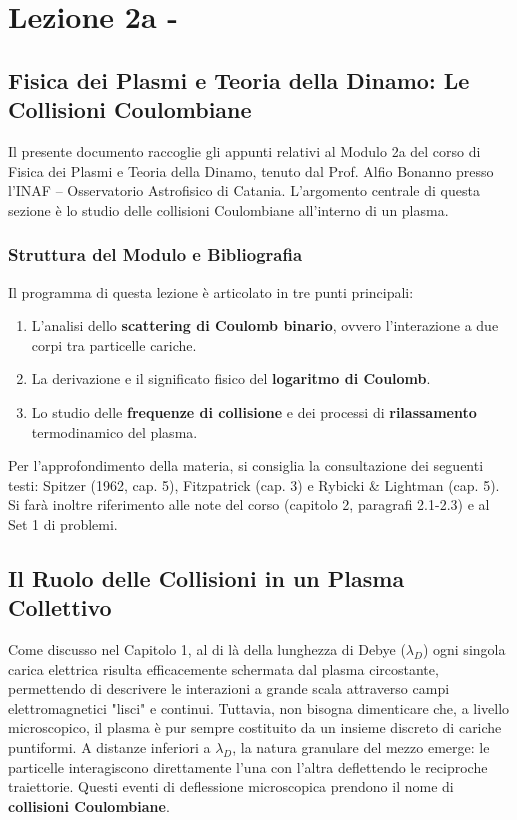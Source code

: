 \chapter{Lezione 2a -}

\section{Fisica dei Plasmi e Teoria della Dinamo: Le Collisioni Coulombiane}

Il presente documento raccoglie gli appunti relativi al Modulo 2a del corso di Fisica dei Plasmi e Teoria della Dinamo, tenuto dal Prof. Alfio Bonanno presso l'INAF – Osservatorio Astrofisico di Catania. L'argomento centrale di questa sezione è lo studio delle collisioni Coulombiane all'interno di un plasma.

\subsection{Struttura del Modulo e Bibliografia}

Il programma di questa lezione è articolato in tre punti principali:
\begin{enumerate}
\item L'analisi dello \textbf{scattering di Coulomb binario}, ovvero l'interazione a due corpi tra particelle cariche.
\item La derivazione e il significato fisico del \textbf{logaritmo di Coulomb}.
\item Lo studio delle \textbf{frequenze di collisione} e dei processi di \textbf{rilassamento} termodinamico del plasma.
\end{enumerate}

Per l'approfondimento della materia, si consiglia la consultazione dei seguenti testi: Spitzer (1962, cap. 5), Fitzpatrick (cap. 3) e Rybicki \& Lightman (cap. 5). Si farà inoltre riferimento alle note del corso (capitolo 2, paragrafi 2.1-2.3) e al Set 1 di problemi.

\section{Il Ruolo delle Collisioni in un Plasma Collettivo}

Come discusso nel Capitolo 1, al di là della lunghezza di Debye ($\lambda_D$) ogni singola carica elettrica risulta efficacemente schermata dal plasma circostante, permettendo di descrivere le interazioni a grande scala attraverso campi elettromagnetici "lisci" e continui. Tuttavia, non bisogna dimenticare che, a livello microscopico, il plasma è pur sempre costituito da un insieme discreto di cariche puntiformi. A distanze inferiori a $\lambda_D$, la natura granulare del mezzo emerge: le particelle interagiscono direttamente l'una con l'altra deflettendo le reciproche traiettorie. Questi eventi di deflessione microscopica prendono il nome di \textbf{collisioni Coulombiane}.

